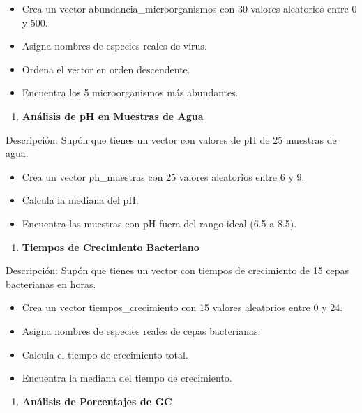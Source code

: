 \documentclass[
]{book}
\providecommand{\tightlist}{%
  \setlength{\itemsep}{0pt}\setlength{\parskip}{0pt}}
\begin{document}
\begin{itemize}
\tightlist
\item
  Crea un vector abundancia\_microorganismos con 30 valores aleatorios entre 0 y 500.
\item
  Asigna nombres de especies reales de virus.
\item
  Ordena el vector en orden descendente.
\item
  Encuentra los 5 microorganismos más abundantes.
\end{itemize}

\begin{enumerate}
\def\labelenumi{\arabic{enumi}.}
\setcounter{enumi}{4}
\tightlist
\item
  \textbf{Análisis de pH en Muestras de Agua}
\end{enumerate}

Descripción: Supón que tienes un vector con valores de pH de 25 muestras de agua.

\begin{itemize}
\tightlist
\item
  Crea un vector ph\_muestras con 25 valores aleatorios entre 6 y 9.
\item
  Calcula la mediana del pH.
\item
  Encuentra las muestras con pH fuera del rango ideal (6.5 a 8.5).
\end{itemize}

\begin{enumerate}
\def\labelenumi{\arabic{enumi}.}
\setcounter{enumi}{5}
\tightlist
\item
  \textbf{Tiempos de Crecimiento Bacteriano}
\end{enumerate}

Descripción: Supón que tienes un vector con tiempos de crecimiento de 15 cepas bacterianas en horas.

\begin{itemize}
\tightlist
\item
  Crea un vector tiempos\_crecimiento con 15 valores aleatorios entre 0 y 24.
\item
  Asigna nombres de especies reales de cepas bacterianas.
\item
  Calcula el tiempo de crecimiento total.
\item
  Encuentra la mediana del tiempo de crecimiento.
\end{itemize}

\begin{enumerate}
\def\labelenumi{\arabic{enumi}.}
\setcounter{enumi}{6}
\tightlist
\item
  \textbf{Análisis de Porcentajes de GC}
\end{enumerate}
\end{document}
